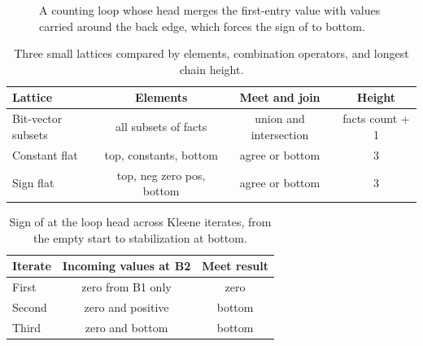 \begin{figure}
\caption{A counting loop whose head merges the first-entry value with values carried around the back edge, which forces the sign of  to bottom.}
\label{fig:ch10-loop}
\end{figure}

\begin{table}
\caption{Three small lattices compared by elements, combination operators, and longest chain height.}
\label{tab:ch10-lattices}
\begin{tabular}{lccc}
\toprule
Lattice & Elements & Meet and join & Height \\
\midrule
Bit-vector subsets & all subsets of facts & union and intersection & facts count + 1 \\
Constant flat & top, constants, bottom & agree or bottom & 3 \\
Sign flat & top, neg zero pos, bottom & agree or bottom & 3 \\
\bottomrule
\end{tabular}
\end{table}

\begin{table}
\caption{Sign of  at the loop head across Kleene iterates, from the empty start to stabilization at bottom.}
\label{tab:ch10-trace}
\begin{tabular}{lcc}
\toprule
Iterate & Incoming values at B2 & Meet result \\
\midrule
First & zero from B1 only & zero \\
Second & zero and positive & bottom \\
Third & zero and bottom & bottom \\
\bottomrule
\end{tabular}
\end{table}

